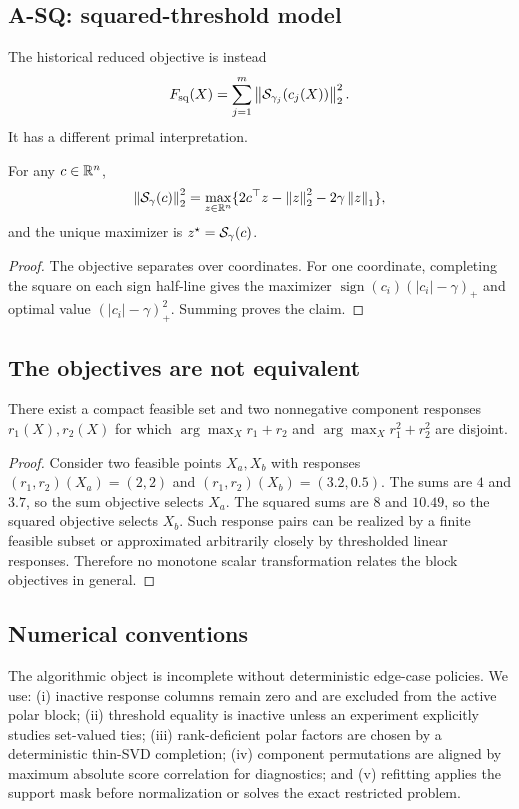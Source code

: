 \subsection{A-SQ: squared-threshold model}
The historical reduced objective is instead
\begin{equation}
F_{\mathrm{sq}}(X)=\sum_{j=1}^m\left\lVert \mathcal{S}_{\gamma_j}(c_j(X)) \right\rVert_2^2.
\label{eq:asq}
\end{equation}
It has a different primal interpretation.
\begin{proposition}
\label{prop:quadratic-lift}
For any \(c\in\mathbb{R}^n\),
\[
\left\lVert \mathcal{S}_\gamma(c) \right\rVert_2^2
=\max_{z\in\mathbb{R}^n}\{2c^\top z-\left\lVert z \right\rVert_2^2-2\gamma\left\lVert z \right\rVert_1\},
\]
and the unique maximizer is \(z^\star=\mathcal{S}_\gamma(c)\).
\end{proposition}
\begin{proof}
The objective separates over coordinates. For one coordinate, completing the square on each sign half-line gives the maximizer \(\operatorname{sign}(c_i)(|c_i|-\gamma)_+\) and optimal value \((|c_i|-\gamma)_+^2\). Summing proves the claim.
\end{proof}

\subsection{The objectives are not equivalent}
\begin{proposition}
\label{prop:counterexample}
There exist a compact feasible set and two nonnegative component responses \(r_1(X),r_2(X)\) for which \(\arg\max_X r_1+r_2\) and \(\arg\max_X r_1^2+r_2^2\) are disjoint.
\end{proposition}
\begin{proof}
Consider two feasible points \(X_a,X_b\) with responses \((r_1,r_2)(X_a)=(2,2)\) and \((r_1,r_2)(X_b)=(3.2,0.5)\). The sums are \(4\) and \(3.7\), so the sum objective selects \(X_a\). The squared sums are \(8\) and \(10.49\), so the squared objective selects \(X_b\). Such response pairs can be realized by a finite feasible subset or approximated arbitrarily closely by thresholded linear responses. Therefore no monotone scalar transformation relates the block objectives in general.
\end{proof}



\subsection{Numerical conventions}
The algorithmic object is incomplete without deterministic edge-case policies. We use: (i) inactive response columns remain zero and are excluded from the active polar block; (ii) threshold equality is inactive unless an experiment explicitly studies set-valued ties; (iii) rank-deficient polar factors are chosen by a deterministic thin-SVD completion; (iv) component permutations are aligned by maximum absolute score correlation for diagnostics; and (v) refitting applies the support mask before normalization or solves the exact restricted problem.



